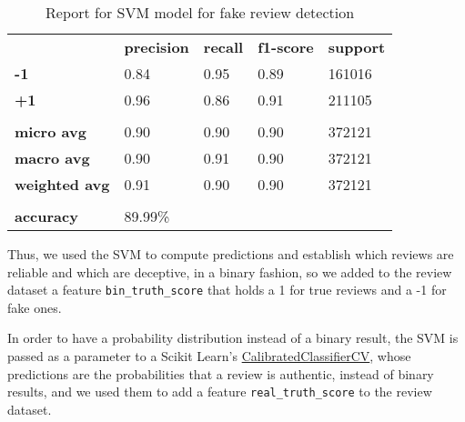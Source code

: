 \begin{table}[h]
	\centering
	\begin{tabular}{lllll}
		\rowcolor[HTML]{EEEEEE} 
		\cellcolor[HTML]{FBFBFB} & \textbf{precision} & \textbf{recall} & \textbf{f1-score} & \textbf{support} \\
		\rowcolor[HTML]{EEEEEE} 
		\textbf{-1}              & 0.84               & 0.95            & 0.89              & 161016           \\
		\rowcolor[HTML]{EEEEEE} 
		\textbf{+1}              & 0.96               & 0.86            & 0.91              & 211105           \\
		\rowcolor[HTML]{FBFBFB} 
		&                    &                 &                   &                  \\
		\rowcolor[HTML]{EEEEEE} 
		\textbf{micro avg}       & 0.90               & 0.90            & 0.90              & 372121           \\
		\rowcolor[HTML]{EEEEEE} 
		\textbf{macro avg}       & 0.90               & 0.91            & 0.90              & 372121           \\
		\rowcolor[HTML]{EEEEEE} 
		\textbf{weighted avg}    & 0.91               & 0.90            & 0.90              & 372121           \\
		\rowcolor[HTML]{FBFBFB} 
		&                    &                 &                   &                  \\
		\rowcolor[HTML]{EEEEEE} 
		\textbf{accuracy}        & \multicolumn{4}{l}{\cellcolor[HTML]{EEEEEE}89.99\%}                        
	\end{tabular}
	
	\caption{Report for SVM model for fake review detection}
	\label{tab:svm-fake-rev}
\end{table}

Thus, we used the SVM to compute predictions and establish which reviews are reliable and which are deceptive, in a binary fashion, so we added to the review dataset a feature \texttt{bin\_truth\_score} that holds a 1 for true reviews and a -1 for fake ones.

In order to have a probability distribution instead of a binary result, the SVM is passed as a parameter to a Scikit Learn's \href{https://scikit-learn.org/stable/modules/generated/sklearn.calibration.CalibratedClassifierCV.html}{CalibratedClassifierCV}, whose predictions are the probabilities that a review is authentic, instead of binary results, and we used them to add a feature \texttt{real\_truth\_score} to the review dataset.

